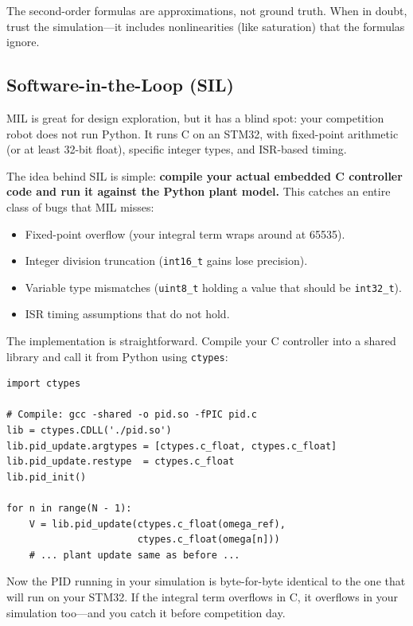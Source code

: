 The second-order formulas are approximations, not ground truth. When in doubt,
trust the simulation---it includes nonlinearities (like saturation) that the
formulas ignore.

\subsection{Software-in-the-Loop (SIL)}

MIL is great for design exploration, but it has a blind spot: your competition
robot does not run Python. It runs C on an STM32, with fixed-point arithmetic
(or at least 32-bit float), specific integer types, and ISR-based timing.

The idea behind SIL is simple: \textbf{compile your actual embedded C
controller code and run it against the Python plant model.} This catches an
entire class of bugs that MIL misses:
\begin{itemize}
    \item Fixed-point overflow (your integral term wraps around at 65535).
    \item Integer division truncation (\texttt{int16\_t} gains lose precision).
    \item Variable type mismatches (\texttt{uint8\_t} holding a value that
          should be \texttt{int32\_t}).
    \item ISR timing assumptions that do not hold.
\end{itemize}

The implementation is straightforward. Compile your C controller into a shared
library and call it from Python using \texttt{ctypes}:

\begin{verbatim}
import ctypes

# Compile: gcc -shared -o pid.so -fPIC pid.c
lib = ctypes.CDLL('./pid.so')
lib.pid_update.argtypes = [ctypes.c_float, ctypes.c_float]
lib.pid_update.restype  = ctypes.c_float
lib.pid_init()

for n in range(N - 1):
    V = lib.pid_update(ctypes.c_float(omega_ref),
                       ctypes.c_float(omega[n]))
    # ... plant update same as before ...
\end{verbatim}

Now the PID running in your simulation is byte-for-byte identical to the one
that will run on your STM32. If the integral term overflows in C, it overflows
in your simulation too---and you catch it before competition day.

